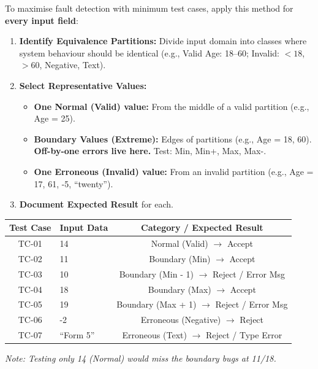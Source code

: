 \documentclass[11pt]{article}
\begin{document}
\begin{methode}
To maximise fault detection with minimum test cases, apply this method for \textbf{every input field}:
\begin{enumerate}
    \item \textbf{Identify Equivalence Partitions:} Divide input domain into classes where system behaviour should be identical (e.g., Valid Age: 18--60; Invalid: $<18$, $>60$, Negative, Text).
    \item \textbf{Select Representative Values:}
    \begin{itemize}
        \item \textbf{One Normal (Valid) value:} From the middle of a valid partition (e.g., Age = 25).
        \item \textbf{Boundary Values (Extreme):} Edges of partitions (e.g., Age = 18, 60). \textbf{Off-by-one errors live here.} Test: Min, Min+, Max, Max-.
        \item \textbf{One Erroneous (Invalid) value:} From an invalid partition (e.g., Age = 17, 61, -5, ``twenty'').
    \end{itemize}
    \item \textbf{Document Expected Result} for each.
\end{enumerate}
\end{methode}

\begin{exemplebox}
\begin{center}
\begin{tabularx}{\linewidth}{|c|X|c|}\hline
\textbf{Test Case} & \textbf{Input Data} & \textbf{Category / Expected Result} \\ \hline
TC-01 & 14 & Normal (Valid) $\rightarrow$ Accept \\ \hline
TC-02 & 11 & Boundary (Min) $\rightarrow$ Accept \\ \hline
TC-03 & 10 & Boundary (Min - 1) $\rightarrow$ Reject / Error Msg \\ \hline
TC-04 & 18 & Boundary (Max) $\rightarrow$ Accept \\ \hline
TC-05 & 19 & Boundary (Max + 1) $\rightarrow$ Reject / Error Msg \\ \hline
TC-06 & -2 & Erroneous (Negative) $\rightarrow$ Reject \\ \hline
TC-07 & ``Form 5'' & Erroneous (Text) $\rightarrow$ Reject / Type Error \\ \hline
\end{tabularx}
\end{center}
\textit{Note: Testing only 14 (Normal) would miss the boundary bugs at 11/18.}
\end{exemplebox}
\end{document}
